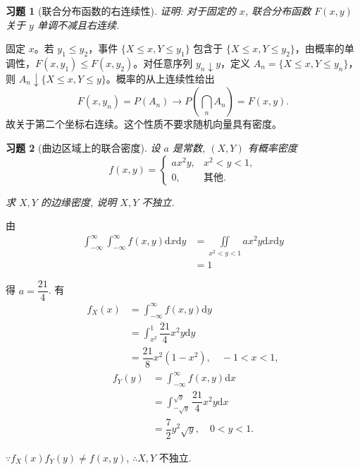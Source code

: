\documentclass[12pt,fontset=fandol]{ctexart}
\newtheorem{exercise}{习题}[section]
\begin{document}
\begin{exercise}[联合分布函数的右连续性]\label{q:A4.5}
证明: 对于固定的 $x$, 联合分布函数 $F(x,y)$ 关于 $y$ 单调不减且右连续.\par{}
\end{exercise}

\begin{solve}\label{a:A4.5}固定 $x$。若 $y_1\le y_2$，事件 $\{X\le x,Y\le y_1\}$ 包含于 $\{X\le x,Y\le y_2\}$，由概率的单调性，$F(x,y_1)\le F(x,y_2)$。对任意序列 $y_n\downarrow y$，定义 $A_n=\{X\le x,Y\le y_n\}$，则 $A_n\downarrow\{X\le x,Y\le y\}$。概率的从上连续性给出\[F(x,y_n)=P(A_n)\longrightarrow P\left(\bigcap_nA_n\right)=F(x,y).\]故关于第二个坐标右连续。这个性质不要求随机向量具有密度。\end{solve}

\begin{exercise}[曲边区域上的联合密度]\label{q:A4.11}
设 $a$ 是常数, $(X,Y)$ 有概率密度
    \[f(x,y)=\begin{cases}
        ax^2y, & x^2<y<1, \\
        0, & \text{其他}.
    \end{cases}\]

    求 $X,Y$ 的边缘密度, 说明 $X,Y$ 不独立.\par{}
\end{exercise}

\begin{solve}\label{a:A4.11}
    由
    \[\begin{aligned}\int_{-\infty}^\infty\int_{-\infty}^\infty f(x,y)\mathrm{d}x\mathrm{d}y&=\iint\limits_{x^2<y<1}ax^2y\mathrm{d}x\mathrm{d}y\\&=1\end{aligned}\]

    得 $a=\dfrac{21}{4}$. 有
    \[\begin{aligned}f_X(x)&=\int_{-\infty}^\infty f(x,y)\mathrm{d}y\\&=\int_{x^2}^1\dfrac{21}{4}x^2y\mathrm{d}y\\&=\dfrac{21}{8}x^2(1-x^2),\quad -1<x<1,\end{aligned}\]
    \[\begin{aligned}f_Y(y)&=\int_{-\infty}^\infty f(x,y)\mathrm{d}x\\&=\int_{-\sqrt{y}}^{\sqrt{y}}\dfrac{21}{4}x^2y\mathrm{d}x\\&=\dfrac{7}{2}y^2\sqrt{y},\quad 0<y<1.\end{aligned}\]

    $\because f_X(x)f_Y(y)\neq f(x,y)$, $\therefore X,Y$ 不独立.
\end{solve}
\end{document}
